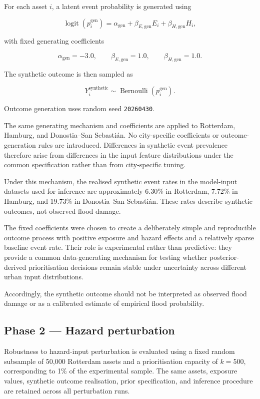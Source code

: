 \documentclass[
]{article}
\begin{document}
For each asset \(i\), a latent event probability is generated using

\[
\operatorname{logit}(p_i^{\mathrm{gen}})
=
\alpha_{\mathrm{gen}}
+
\beta_{E,\mathrm{gen}} E_i
+
\beta_{H,\mathrm{gen}} H_i,
\]

with fixed generating coefficients

\[
\alpha_{\mathrm{gen}}=-3.0,
\qquad
\beta_{E,\mathrm{gen}}=1.0,
\qquad
\beta_{H,\mathrm{gen}}=1.0.
\]

The synthetic outcome is then sampled as

\[
Y_i^{\mathrm{synthetic}}
\sim
\operatorname{Bernoulli}
\left(
p_i^{\mathrm{gen}}
\right).
\]

Outcome generation uses random seed \texttt{20260430}.

The same generating mechanism and coefficients are applied to Rotterdam,
Hamburg, and Donostia--San Sebastián. No city-specific coefficients or
outcome-generation rules are introduced. Differences in synthetic event
prevalence therefore arise from differences in the input feature
distributions under the common specification rather than from
city-specific tuning.

Under this mechanism, the realised synthetic event rates in the
model-input datasets used for inference are approximately 6.30\% in
Rotterdam, 7.72\% in Hamburg, and 19.73\% in Donostia--San Sebastián.
These rates describe synthetic outcomes, not observed flood damage.

The fixed coefficients were chosen to create a deliberately simple and
reproducible outcome process with positive exposure and hazard effects
and a relatively sparse baseline event rate. Their role is experimental
rather than predictive: they provide a common data-generating mechanism
for testing whether posterior-derived prioritisation decisions remain
stable under uncertainty across different urban input distributions.

Accordingly, the synthetic outcome should not be interpreted as observed
flood damage or as a calibrated estimate of empirical flood probability.

\subsection{Phase 2 --- Hazard
perturbation}\label{phase-2-hazard-perturbation}

Robustness to hazard-input perturbation is evaluated using a fixed
random subsample of 50,000 Rotterdam assets and a prioritisation
capacity of \(k=500\), corresponding to 1\% of the experimental sample.
The same assets, exposure values, synthetic outcome realisation, prior
specification, and inference procedure are retained across all
perturbation runs.
\end{document}
